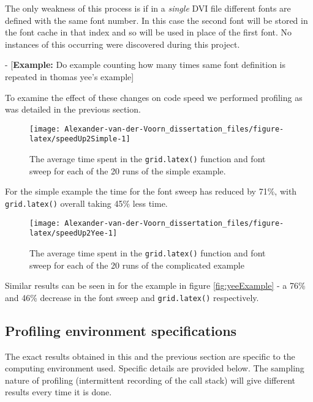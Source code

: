 \documentclass[]{article}
\begin{document}
The only weakness of this process is if in a \emph{single} DVI file
different fonts are defined with the same font number. In this case the
second font will be stored in the font cache in that index and so will
be used in place of the first font. No instances of this occurring were
discovered during this project.

- {[}\textbf{Example:} Do example counting how many times same font
definition is repeated in thomas yee's example{]}

To examine the effect of these changes on code speed we performed
profiling as was detailed in the previous section.

\begin{figure}

{\centering \texttt{[image: Alexander-van-der-Voorn\_dissertation\_files/figure-latex/speedUp2Simple-1]} 

}

\caption{The average time spent in the \texttt{grid.latex()} function and font sweep for each of the 20 runs of the simple example.}\label{fig:speedUp2Simple}
\end{figure}

For the simple example the time for the font sweep has reduced by 71\%,
with \texttt{grid.latex()} overall taking 45\% less time.

\begin{figure}

{\centering \texttt{[image: Alexander-van-der-Voorn\_dissertation\_files/figure-latex/speedUp2Yee-1]} 

}

\caption{The average time spent in the \texttt{grid.latex()} function and font sweep for each of the 20 runs of the complicated example}\label{fig:speedUp2Yee}
\end{figure}

Similar results can be seen in for the example in figure
\ref{fig:yeeExample} - a 76\% and 46\% decrease in the font sweep and
\texttt{grid.latex()} respectively.

\subsection{Profiling environment
specifications}\label{profiling-environment-specifications}

The exact results obtained in this and the previous section are specific
to the computing environment used. Specific details are provided below.
The sampling nature of profiling (intermittent recording of the call
stack) will give different results every time it is done.
\end{document}
